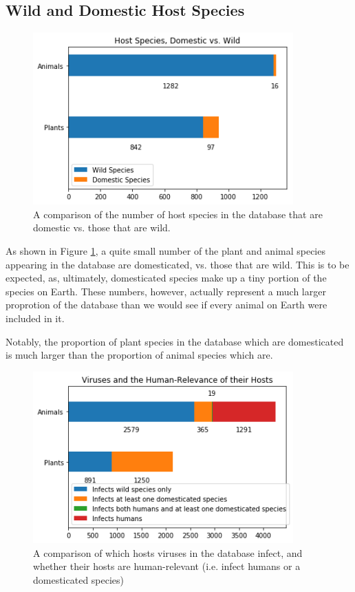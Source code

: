 \documentclass[12pt]{article}
\begin{document}
    \subsection{Wild and Domestic Host Species}

    \begin{figure}[H]
        \begin{center}
            \includegraphics[width=100mm]{host_species_domestic_wild_figure.png}
            \caption{A comparison of the number of host species in the database
            that are domestic vs. those that are wild.}
            \label{host_species_domestic_wild_figure}
        \end{center}
    \end{figure}

    As shown in Figure \ref{host_species_domestic_wild_figure}, a quite small
    number of the plant and animal species appearing in the database are
    domesticated, vs. those that are wild. This is to be expected, as,
    ultimately, domesticated species make up a tiny portion of the species
    on Earth. These numbers, however, actually represent a much larger
    proprotion of the database than we would see if every animal on Earth
    were included in it.

    Notably, the proportion of plant species in the database which are
    domesticated is much larger than the proportion of animal species which
    are.

    \begin{figure}[H]
        \begin{center}
            \includegraphics[width=100mm]{viruses_human_relevance.png}
            \caption{A comparison of which hosts viruses in the database
            infect, and whether their hosts are human-relevant (i.e. infect
            humans or a domesticated species)}
            \label{viruses_human_relevance_figure}
        \end{center}
    \end{figure}
\end{document}
